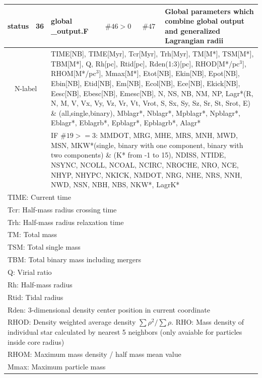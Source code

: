 \begin{longtable}{||p{0.42in}|p{0.25in}|p{0.6in}|p{0.6in}|p{0.4in}|p{2.3in}||}
status    & 36  & global \_output.F & $\#46>0$ & $\#47$ & Global parameters which combine global output and generalized Lagrangian radii \\\hline
\multicolumn{2}{|c|}{ N-label } & \multicolumn{4}{|p{4.4in}|}{TIME[NB], TIME[Myr], Tcr[Myr], Trh[Myr], TM[M*], TSM[M*], TBM[M*], Q, Rh[pc], Rtid[pc], Rden(1:3)[pc], RHOD[M*/pc$^3$], RHOM[M*/pc$^3$], Mmax[M*], Etot[NB], Ekin[NB], Epot[NB], Ebin[NB], Etid[NB], Em[NB], Ecol[NB], Ece[NB], Ekick[NB], Eesc[NB], Ebesc[NB], Emesc[NB], N, NS, NB, NM, NP, Lagr*(R, N, M, V, Vx, Vy, Vz, Vr, Vt, Vrot, S, Sx, Sy, Sz, Sr, St, Srot, E) \& (all,single,binary), Mblagr*, Nblagr*, Mpblagr*, Npblagr*, Eblagr*, Eblagrb*, Epblagr*, Epblagrb*, Alagr*}\\
\multicolumn{2}{|c|}{         } & \multicolumn{4}{|p{4.4in}|}{IF $\#19>=3$: MMDOT, MRG, MHE, MRS, MNH, MWD, MSN, MKW*(single, binary with one component, binary with two components) \& (K* from -1 to 15), NDISS, NTIDE, NSYNC, NCOLL, NCOAL, NCIRC, NROCHE, NRO, NCE, NHYP, NHYPC, NKICK, NMDOT, NRG, NHE, NRS, NNH, NWD, NSN, NBH, NBS, NKW*, LagrK*}\\\hline
\multicolumn{6}{|p{5.4in}|}{TIME: Current time}\\
\multicolumn{6}{|p{5.4in}|}{Tcr: Half-mass radius crossing time}\\
\multicolumn{6}{|p{5.4in}|}{Trh: Half-mass radius relaxation time}\\
\multicolumn{6}{|p{5.4in}|}{TM: Total mass}\\
\multicolumn{6}{|p{5.4in}|}{TSM: Total single mass}\\
\multicolumn{6}{|p{5.4in}|}{TBM: Total binary mass including mergers}\\
\multicolumn{6}{|p{5.4in}|}{Q: Virial ratio}\\
\multicolumn{6}{|p{5.4in}|}{Rh: Half-mass radius}\\
\multicolumn{6}{|p{5.4in}|}{Rtid: Tidal radius}\\
\multicolumn{6}{|p{5.4in}|}{Rden: 3-dimensional density center position in current coordinate}\\
\multicolumn{6}{|p{5.4in}|}{RHOD: Density weighted average density $\sum \rho^2/\sum \rho$. RHO: Mass density of individual star calculated by nearest 5 neighbors (only avaiable for particles inside core radius)}\\
\multicolumn{6}{|p{5.4in}|}{RHOM: Maximum mass density / half mass mean value}\\
\multicolumn{6}{|p{5.4in}|}{Mmax: Maximum particle mass}\\

\end{longtable}
